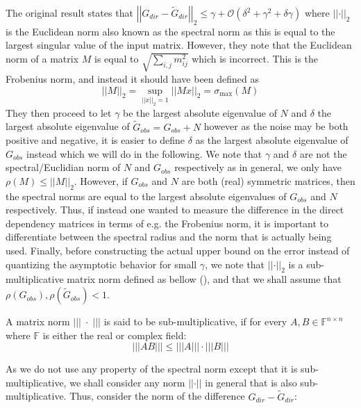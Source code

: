 \documentclass[../Thesis.tex]{subfiles}
\begin{document}
The original result states that $\left|\left| G_{dir} - \tilde{G}_{dir} \right|\right|_2 \leq \gamma + \mathcal{O}\left( \delta^2 + \gamma^2 + \delta \gamma\right)$ where $\left|\left| \cdot \right|\right|_2$ is the Euclidean norm also known as the spectral norm as this is equal to the largest singular value of the input matrix. However, they note that the Euclidean norm of a matrix $M$ is equal to $\sqrt{\sum_{i,j} m_{ij}^2}$ which is incorrect. This is the Frobenius norm, and instead it should have been defined as
$$\left|\left| M \right|\right|_2 = \sup_{\left|\left| x \right|\right|_2 = 1} \left|\left| Mx \right|\right|_2 = \sigma_{\max}\left(M\right)$$
They then proceed to let $\gamma$ be the largest absolute eigenvalue of $N$ and $\delta$ the largest absolute eigenvalue of $\tilde{G}_{obs} = G_{obs} + N$ however as the noise may be both positive and negative, it is easier to define $\delta$ as the largest absolute eigenvalue of $G_{obs}$ instead which we will do in the following. We note that $\gamma$ and $\delta$ are not the spectral/Euclidian norm of $N$ and $G_{obs}$ respectively as in general, we only have $\rho\left(M\right) \leq \left|\left| M \right|\right|_2$. However, if $G_{obs}$ and $N$ are both (real) symmetric matrices, then the spectral norms are equal to the largest absolute eigenvalues of $G_{obs}$ and $N$ respectively. Thus, if instead one wanted to measure the difference in the direct dependency matrices in terms of e.g. the Frobenius norm, it is important to differentiate between the spectral radius and the norm that is actually being used. Finally, before constructing the actual upper bound on the error instead of quantizing the asymptotic behavior for small $\gamma$, we note that $\left|\left| \cdot \right|\right|_2$ is a sub-multiplicative matrix norm defined as bellow (\cite{MATRIX_ANALYSIS-Horn_Johnson_2012}), and that we shall assume that $\rho\left(G_{obs}\right), \rho\left(\tilde{G}_{obs}\right) < 1$.
\begin{definition}\label{def:sub-multiplicative matrix norm}
    A matrix norm $\left|\left|\left| \; \cdot \; \right|\right|\right|$ is said to be sub-multiplicative, if for every $A,B \in \mathbb{F}^{n\times n}$ where $\mathbb{F}$ is either the real or complex field:
    $$\left|\left|\left| AB\right|\right|\right| \leq \left|\left|\left| A \right|\right|\right|\cdot \left|\left|\left| B \right|\right|\right|$$
\end{definition}
As we do not use any property of the spectral norm except that it is sub-multiplicative, we shall consider any norm $\left|\left| \cdot \right|\right|$ in general that is also sub-multiplicative. Thus, consider the norm of the difference $G_{dir} - \tilde{G}_{dir}$:
\end{document}
